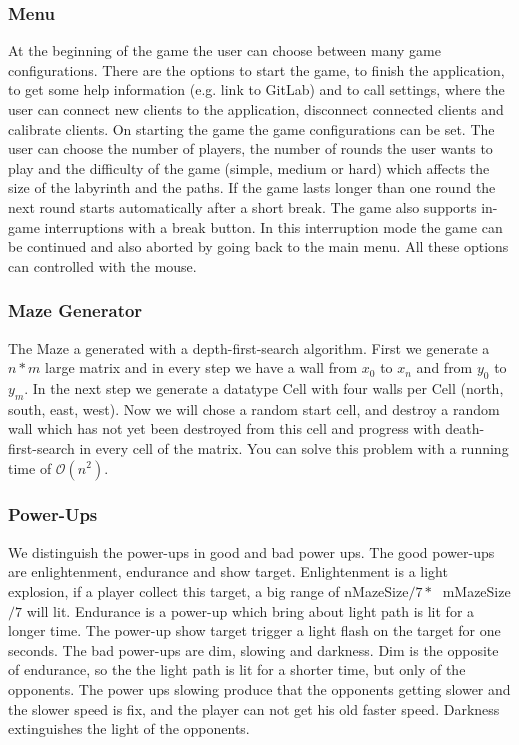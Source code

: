 \documentclass{sigchi}
\begin{document}
\subsubsection{Menu}
At the beginning of the game the user can choose between many game configurations. There are the options to start the game, to finish the application, to get some help information (e.g. link to GitLab) and to call settings, where the user can connect new clients to the application, disconnect connected clients and calibrate clients. On starting the game the game configurations can be set. The user can choose the number of players, the number of rounds the user wants to play and the difficulty of the game (simple, medium or hard) which affects the size of the labyrinth and the paths. If the game lasts longer than one round the next round starts automatically after a short break. The game also supports in-game interruptions with a break button. In this interruption mode the game can be continued and also aborted by going back to the main menu. All these options can controlled with the mouse.
\subsubsection{Maze Generator} 
The Maze a generated with a depth-first-search algorithm. First we generate a $n*m$ large matrix and in every step we have a wall from $x_{0}$ to $x_{n}$ and from $y_{0}$ to $y_{m}$. In the next step we generate a datatype Cell with four walls per Cell (north, south, east, west). Now we will chose a random start cell, and destroy a random wall which has not yet been destroyed from this cell and progress with death-first-search in every cell of the matrix. You can solve this problem with a running time of $\mathcal{O}(n^2)$.
\subsubsection{Power-Ups} 
We distinguish the power-ups in good and bad power ups. The good power-ups are enlightenment, endurance and show target. Enlightenment is a light explosion, if a player collect this target, a big range of nMazeSize$/7 *\;$ mMazeSize$/7$ will lit. Endurance is a power-up which bring about light path is lit for a longer time. The power-up show target trigger a light flash on the target for one seconds. The bad power-ups are dim, slowing and darkness. Dim is the opposite of endurance, so the the light path is lit for a shorter time, but only of the opponents. The power ups slowing produce that the opponents getting slower and the slower speed is fix, and the player can not get his old faster speed. Darkness extinguishes the light of the opponents. 
\end{document}
